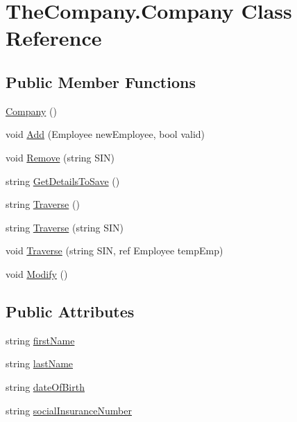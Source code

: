 \hypertarget{class_the_company_1_1_company}{}\section{The\+Company.\+Company Class Reference}
\label{class_the_company_1_1_company}
\subsection*{Public Member Functions}
\begin{DoxyCompactItemize}
\item 
\hyperlink{class_the_company_1_1_company_a410c02d40ad8dadb6073610086afe1db}{Company} ()
\item 
void \hyperlink{class_the_company_1_1_company_a69665e774c6dca3b6366d65a7219d7ef}{Add} (Employee new\+Employee, bool valid)
\item 
void \hyperlink{class_the_company_1_1_company_a7344db964f237ce99c534f6f60c22558}{Remove} (string S\+I\+N)
\item 
string \hyperlink{class_the_company_1_1_company_a5cb23185b13b193a5181f71e4177aff5}{Get\+Details\+To\+Save} ()
\item 
string \hyperlink{class_the_company_1_1_company_a5c8a24a34da6eebcabc743ecab67f81d}{Traverse} ()
\item 
string \hyperlink{class_the_company_1_1_company_a03fa6056367b58fb1fad29417a8a206a}{Traverse} (string S\+I\+N)
\item 
void \hyperlink{class_the_company_1_1_company_a69d694b686152bad2d1220f837578a4f}{Traverse} (string S\+I\+N, ref Employee temp\+Emp)
\item 
void \hyperlink{class_the_company_1_1_company_a90db193981072dbc3a7039739cc84671}{Modify} ()
\end{DoxyCompactItemize}
\subsection*{Public Attributes}
\begin{DoxyCompactItemize}
\item 
string \hyperlink{class_the_company_1_1_company_ac8e2b17c2cb8d2827316bdd94315656d}{first\+Name}
\item 
string \hyperlink{class_the_company_1_1_company_a8b7079edba0fc7a04a7b3b3c96146f41}{last\+Name}
\item 
string \hyperlink{class_the_company_1_1_company_af1f444cbde9ffb5cce862ded889095a9}{date\+Of\+Birth}
\item 
string \hyperlink{class_the_company_1_1_company_a3d40e1c556b2289dc7e902712fc83d9f}{social\+Insurance\+Number}
\end{DoxyCompactItemize}
